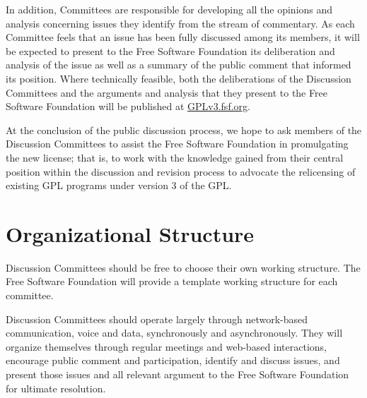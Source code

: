 In addition, Committees are responsible for developing all the opinions
and analysis concerning issues they identify from the stream of
commentary. As each Committee feels that an issue has been fully discussed
among its members, it will be expected to present to the Free Software
Foundation its deliberation and analysis of the issue as well as a summary
of the public comment that informed its position. Where technically
feasible, both the deliberations of the Discussion Committees and the
arguments and analysis that they present to the Free Software Foundation
will be published at \url{GPLv3.fsf.org}.

At the conclusion of the public discussion process, we hope to ask
members of the Discussion Committees to assist the Free Software Foundation
in promulgating the new license; that is, to work with the knowledge
gained from their central position within the discussion and revision
process to advocate the relicensing of existing GPL programs under version
3 of the GPL.

\section{Organizational Structure}

Discussion Committees should be free to choose their own working structure.
The Free Software Foundation will provide a template working structure
for each committee.

Discussion Committees should operate largely through network-based
communication, voice and data, synchronously and asynchronously. They
will organize themselves through regular meetings and web-based
interactions, encourage public comment and participation, identify and
discuss issues, and present those issues and all relevant argument to the
Free Software Foundation for ultimate resolution.
